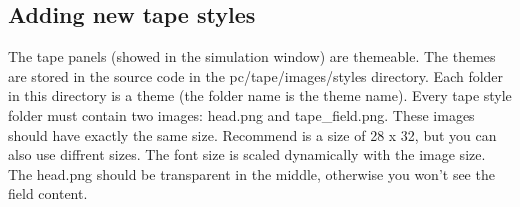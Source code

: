 \documentclass[%
  a4paper,%
  11pt,%
  blue,%
  hyperref	%
  ]{tubsartcl}
\begin{document}
\subsection{Adding new tape styles}
\label{sec:adding-new-tape}

The tape panels (showed in the simulation window) are themeable. The themes are stored in the source code in the pc/tape/images/styles directory. Each folder in this directory is a theme (the folder name is the theme name). Every tape style folder must contain two images: head.png and tape\_field.png. These images should have exactly the same size. Recommend is a size of 28 x 32, but you can also use diffrent sizes. The font size is scaled dynamically with the image size. The head.png should be transparent in the middle, otherwise you won't see the field content.

\makebackpage[trisec]%
\end{document}
